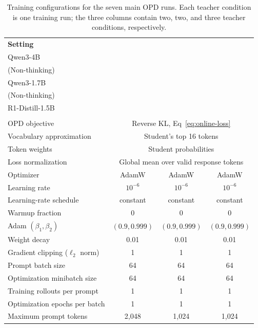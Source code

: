 \begin{table}[htbp]
  \centering
  \normalsize
  \setlength{\tabcolsep}{4pt}
  \renewcommand{\arraystretch}{1.08}
  \caption{Training configurations for the seven main OPD runs. Each teacher
  condition is one training run; the three columns contain two, two, and
  three teacher conditions, respectively.}
  \label{tab:opd-training-config}
  \begin{tabular}{@{}lccc@{}}
    \hline
    \textbf{Setting} & \shortstack{\textbf{Code}\\Qwen3-4B\\(Non-thinking)}
      & \shortstack{\textbf{Math}\\Qwen3-1.7B\\(Non-thinking)}
      & \shortstack{\textbf{Math}\\R1-Distill-1.5B\\\strut} \\
    \hline
    OPD objective & \multicolumn{3}{c}{Reverse KL, Eq~\eqref{eq:online-loss}} \\
    Vocabulary approximation & \multicolumn{3}{c}{Student's top 16 tokens} \\
    Token weights & \multicolumn{3}{c}{Student probabilities} \\
    Loss normalization & \multicolumn{3}{c}{Global mean over valid response tokens} \\
    \hline
    Optimizer & AdamW & AdamW & AdamW \\
    Learning rate & $10^{-6}$ & $10^{-6}$ & $10^{-6}$ \\
    Learning-rate schedule & constant & constant & constant \\
    Warmup fraction & 0 & 0 & 0 \\
    Adam $(\beta_1,\beta_2)$ & $(0.9, 0.999)$ & $(0.9, 0.999)$ & $(0.9, 0.999)$ \\
    Weight decay & 0.01 & 0.01 & 0.01 \\
    Gradient clipping ($\ell_2$ norm) & 1 & 1 & 1 \\
    Prompt batch size & 64 & 64 & 64 \\
    Optimization minibatch size & 64 & 64 & 64 \\
    Training rollouts per prompt & 1 & 1 & 1 \\
    Optimization epochs per batch & 1 & 1 & 1 \\
    Maximum prompt tokens & 2,048 & 1,024 & 1,024 \\

\end{tabular}
\end{table}
